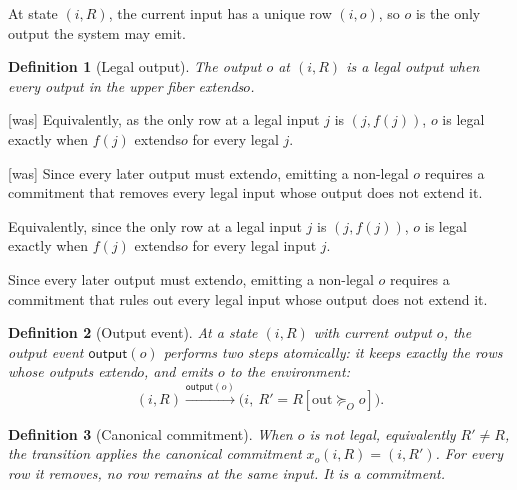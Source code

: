 \documentclass[sigconf]{cidr-2027}
\newtheorem{definition}{Definition}
\theoremstyle{remark}
\newcommand{\OutputGe}{\succeq_O}
\newcommand{\commitment}{commitment\xspace}
\newcommand{\outrel}{extends\xspace}          %
\newcommand{\outrelbase}{extend\xspace}       %
\begin{document}
At state $(i,R)$, the current input has a unique row $(i,o)$, so $o$ is the only
output the system may emit.

\begin{definition}[Legal output]
\label{def:exposable}
The output $o$ at $(i,R)$ is a \emph{legal output} when every output in the
upper fiber \outrel $o$.
\end{definition}



{\footnotesize\color{black!50}\noindent\textsf{[was]} Equivalently, as the only row at a legal input $j$ is $(j,f(j))$, $o$ is legal
exactly when $f(j)$ \outrel $o$ for every legal $j$.\par}



{\footnotesize\color{black!50}\noindent\textsf{[was]} Since every later output must \outrelbase $o$, emitting a non-legal $o$ requires
a \commitment that removes every legal input whose output does not \outrelbase
it.\par}

\color{blue!70!black}Equivalently, since the only row at a legal input $j$ is $(j,f(j))$, $o$ is
legal exactly when $f(j)$ \outrel $o$ for every legal input $j$.\color{black}

\color{blue!70!black}Since every later output must \outrelbase $o$, emitting a non-legal $o$ requires
a \commitment that rules out every legal input whose output does not
\outrelbase it.\color{black}

\begin{definition}[Output event]
\label{def:output-event}
At a state $(i,R)$ with current output $o$, the \emph{output event}
$\mathsf{output}(o)$ performs two steps atomically: it keeps exactly the rows
whose outputs \outrelbase $o$, and emits $o$ to the environment:
\begin{equation}
  (i,R)\xrightarrow{\mathsf{output}(o)}\bigl(i,\ R' = R[\mathrm{out}\OutputGe o]\bigr).
  \label{eq:output-action}
\end{equation}
\end{definition}

\begin{definition}[Canonical \commitment]
\label{def:canonical-commitment-functional}
When $o$ is not legal, equivalently $R'\neq R$, the transition applies the
\emph{canonical \commitment} $x_o(i,R)=(i,R')$.  For every row it removes, no
row remains at the same input.  It is a \commitment.
\end{definition}
\end{document}
